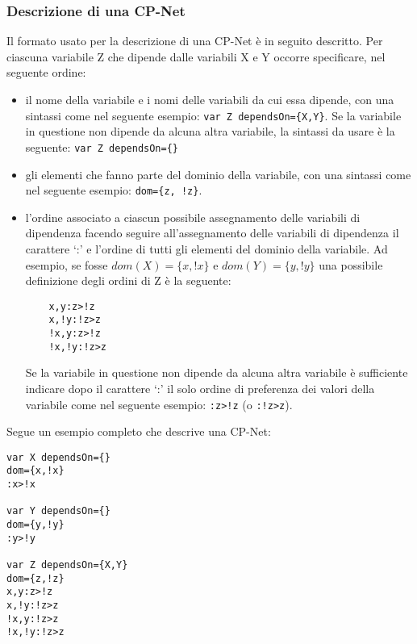 \subsubsection{Descrizione di una CP-Net}
\label{sect:file}
Il formato usato per la descrizione di una CP-Net è in seguito
descritto.  Per ciascuna variabile Z che dipende dalle variabili X e Y
occorre specificare, nel seguente ordine:
\begin{itemize}
\item il nome della variabile e i nomi delle variabili da cui essa
  dipende, con una sintassi come nel seguente esempio: \texttt{var Z
    dependsOn=\{X,Y\}}. Se la variabile in questione non dipende da
  alcuna altra variabile, la sintassi da usare è la seguente:
  \texttt{var Z dependsOn=\{\}}
\item gli elementi che fanno parte del dominio della variabile, con
  una sintassi come nel seguente esempio: \texttt{dom=\{z, !z\}}.
\item l'ordine associato a ciascun possibile assegnamento delle
  variabili di dipendenza facendo seguire all'assegnamento delle
  variabili di dipendenza il carattere `:' e l'ordine di tutti gli
  elementi del dominio della variabile. Ad esempio, se fosse
  $dom(X)=\{x,!x\}$ e $dom(Y)=\{y,!y\}$ una possibile definizione
  degli ordini di Z è la seguente:
  \begin{verbatim}
    x,y:z>!z
    x,!y:!z>z
    !x,y:z>!z
    !x,!y:!z>z
\end{verbatim}
  Se la variabile in questione non dipende da alcuna altra variabile è
  sufficiente indicare dopo il carattere `:' il solo ordine di
  preferenza dei valori della variabile come nel seguente esempio:
  \texttt{:z>!z} (o \texttt{:!z>z}).
\end{itemize}

Segue un esempio completo che descrive una CP-Net:
\begin{verbatim}
var X dependsOn={}
dom={x,!x}
:x>!x

var Y dependsOn={}
dom={y,!y}
:y>!y

var Z dependsOn={X,Y}
dom={z,!z}
x,y:z>!z
x,!y:!z>z
!x,y:!z>z
!x,!y:!z>z
\end{verbatim}